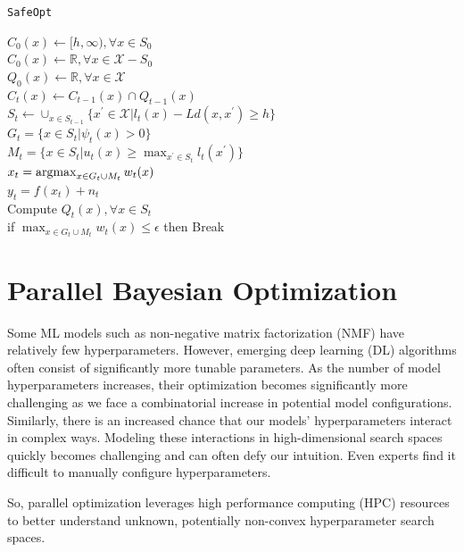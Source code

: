 \begin{algorithm}[H]
	\caption{\texttt{SafeOpt}}
	\label{alg:safeopt}
	$C_0(x) \gets [h, \infty), \forall x \in S_0$\\
	$C_0(x) \gets \mathbb{R}, \forall x \in \mathcal{X} - S_0$\\
	$Q_0(x) \gets \mathbb{R}, \forall x \in \mathcal{X}$\\
	{
		$C_t(x) \gets C_{t-1}(x) \cap Q_{t-1}(x)$\\
		$S_t \gets \cup_{x\in S_{t-1}}\{ x^\prime \in \mathcal{X} | l_t(x) - Ld(x,x^\prime) \geq h \}$\\
		$G_t = \{x \in S_t | \psi_t(x) > 0 \}$\\
		$M_t = \{ x \in S_t |u_t(x) \geq \max_{x^\prime \in S_t} l_t(x^\prime) \}$\\
		$x_t = \operatorname*{argmax}_{x\in G_t \cup M_t}w_t(x)$\\
		$y_t = f(x_t)+n_t$\\
		Compute $Q_t(x), \forall x \in S_t$\\
		if $\max_{ x\in G_t \cup M_t}w_t(x) \leq \epsilon$ then Break
	}
\end{algorithm}

\section{Parallel Bayesian Optimization}\label{sec:parallel-bo}
Some ML models such\textcolor{white}{"}as non-negative matrix factorization (NMF) have relatively few hyperparameters. 
However, emerging deep learning (DL) algorithms often consist of significantly more tunable parameters. 
As the number of model hyperparameters increases, their optimization becomes significantly more challenging as we face a combinatorial increase in potential model configurations. 
Similarly, there is an increased chance that our models' hyperparameters interact in complex ways. 
Modeling these interactions in high-dimensional search spaces quickly becomes challenging and can often defy our intuition. 
Even experts find it difficult to manually configure hyperparameters.

So, parallel optimization leverages high performance computing (HPC) resources to better understand unknown, potentially non-convex hyperparameter search spaces.\textcolor{white}{"}

